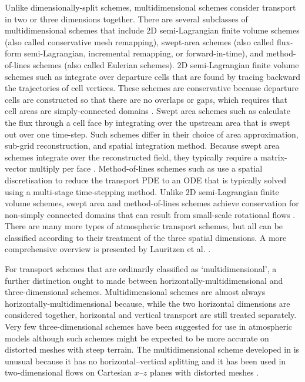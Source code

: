 Unlike dimensionally-split schemes, multidimensional schemes consider transport in two or three dimensions together.
There are several subclasses of multidimensional schemes that include
2D semi-Lagrangian finite volume schemes (also called conservative mesh remapping),
swept-area schemes (also called flux-form semi-Lagrangian, incremental remapping, or forward-in-time),
and method-of-lines schemes (also called Eulerian schemes).
2D semi-Lagrangian finite volume schemes such as \citep{iske-kaeser2004,lauritzen2010} integrate over departure cells that are found by tracing backward the trajectories of cell vertices.  These schemes are conservative because departure cells are constructed so that there are no overlaps or gaps, which requires that cell areas are simply-connected domains \citep{lauritzen2011book}.
Swept area schemes such as \citep{lashley2002,skamarock-menchaca2010,lauritzen2011,thuburn2014} calculate the flux through a cell face by integrating over the upstream area that is swept out over one time-step.  Such schemes differ in their choice of area approximation, sub-grid reconstruction, and spatial integration method.
Because swept area schemes integrate over the reconstructed field, they typically require a matrix-vector multiply per face \citep{thuburn2014,skamarock-menchaca2010}.
Method-of-lines schemes such as \citep{weller2009,skamarock-gassmann2011} use a spatial discretisation to reduce the transport PDE to an ODE that is typically solved using a multi-stage time-stepping method.  
Unlike 2D semi-Lagrangian finite volume schemes, swept area and method-of-lines schemes achieve conservation for non-simply connected domains that can result from small-scale rotational flows \citep{lauritzen2011}.
There are many more types of atmospheric transport schemes, but all can be classified according to their treatment of the three spatial dimensions.  A more comprehensive overview is presented by Lauritzen et al. \cite{lauritzen2014}.

For transport schemes that are ordinarily classified as `multidimensional', a further distinction ought to made between horizontally-multidimensional and three-dimensional schemes.
Multidimensional schemes are almost always horizontally-multidimensional because, while the two horizontal dimensions are considered together, horizontal and vertical transport are still treated separately.
Very few three-dimensional schemes have been suggested for use in atmospheric models \citep[e.g.][]{miura2007,yeh2007,gassmann2013} although such schemes might be expected to be more accurate on distorted meshes with steep terrain.
The multidimensional scheme developed in \citep{weller-shahrokhi2014} is unusual because it has no horizontal--vertical splitting and it has been used in two-dimensional flows on Cartesian $x$--$z$ planes with distorted meshes \citep{shaw-weller2016,weller2017}.

